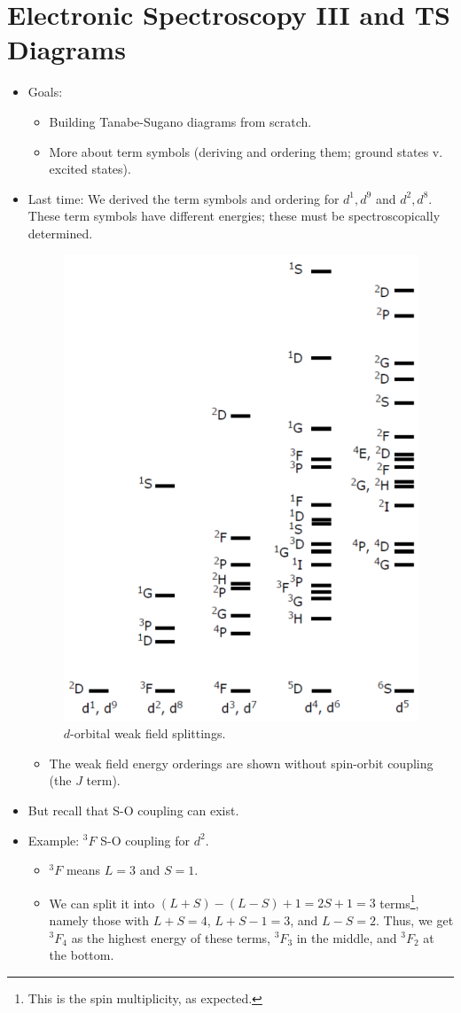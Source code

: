 \documentclass[../notes.tex]{subfiles}
\begin{document}
\section{Electronic Spectroscopy III and TS Diagrams}
\begin{itemize}
    \item {}Goals:
    \begin{itemize}
        \item Building Tanabe-Sugano diagrams from scratch.
        \item More about term symbols (deriving and ordering them; ground states v. excited states).
    \end{itemize}
    \item Last time: We derived the term symbols and ordering for $d^1,d^9$ and $d^2,d^8$. These term symbols have different energies; these must be spectroscopically determined.
    \begin{figure}[h!]
        \centering
        \includegraphics[width=0.4\linewidth]{../ExtFiles/weakSplitD.png}
        \caption{$d$-orbital weak field splittings.}
        \label{fig:weakSplitD}
    \end{figure}
    \begin{itemize}
        \item The weak field energy orderings are shown without spin-orbit coupling (the $J$ term).
    \end{itemize}
    \item But recall that S-O coupling can exist.
    \item Example: ${}^3F$ S-O coupling for $d^2$.
    \begin{itemize}
        \item ${}^3F$ means $L=3$ and $S=1$.
        \item We can split it into $(L+S)-(L-S)+1=2S+1=3$ terms\footnote{This is the spin multiplicity, as expected.}, namely those with $L+S=4$, $L+S-1=3$, and $L-S=2$. Thus, we get ${}^3F_4$ as the highest energy of these terms, ${}^3F_3$ in the middle, and ${}^3F_2$ at the bottom.

\end{itemize}
\end{itemize}
\end{document}
